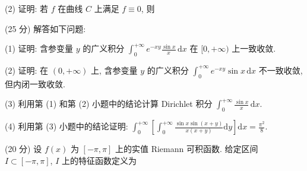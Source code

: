 \nopagebreak[4]
\par{}
(2) 证明: 若 $f$ 在曲线 $C$ 上满足 $f \equiv 0$, 则\par
\nopagebreak[4]
\par{}
(25 分) 解答如下问题:\par
(1) 证明: 含参变量 $y$ 的广义积分 $\int_{0}^{+\infty} e^{-xy} \frac{\sin x}{x} \, \mathrm{d}x$ 在 $[0, +\infty)$ 上一致收敛.\par
(2) 证明: 在 $(0, +\infty)$ 上, 含参变量 $y$ 的广义积分 $\int_{0}^{+\infty} e^{-xy} \sin x \, \mathrm{d}x$ 不一致收敛, 但内闭一致收敛.\par
(3) 利用第 (1) 和第 (2) 小题中的结论计算 Dirichlet 积分 $\int_{0}^{+\infty} \frac{\sin x}{x} \, \mathrm{d}x$.\par
(4) 利用第 (3) 小题中的结论证明: $\int_{0}^{+\infty}\left[\int_{0}^{+\infty}\frac{\sin x\sin(x+y)}{x(x+y)}\mathrm{d}y\right]\mathrm{d}x=\frac{\pi^{2}}{8}$.\par
\par{}
\par{}
(20 分) 设 $f(x)$ 为 $[- \pi, \pi]$ 上的实值 Riemann 可积函数. 给定区间 $I \subset [-\pi, \pi]$, $I$ 上的特征函数定义为\par
\nopagebreak[4]
